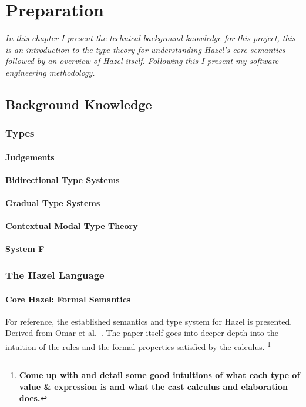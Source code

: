 \chapter{Preparation}
\textit{In this chapter I present the technical background knowledge for this project, this is an introduction to the type theory for understanding Hazel's core semantics followed by an overview of Hazel itself. Following this I present my software engineering methodology.}

\section{Background Knowledge}

\subsection{Types}
\subsubsection{Judgements}

\subsubsection{Bidirectional Type Systems}

\subsubsection{Gradual Type Systems}

\subsubsection{Contextual Modal Type Theory}

\subsubsection{System F}

\subsection{The Hazel Language}

\subsubsection{\textbf{Core Hazel}: Formal Semantics}
For reference, the established semantics and type system for Hazel is presented. Derived from Omar et al.\ \cite{HazelLivePaper}. The paper itself goes into deeper depth into the intuition of the rules and the formal properties satisfied by the calculus.
\footnote{
\textbf{Come up with and detail some good intuitions of what each type of value \& expression is and what the cast calculus and elaboration does.}}
